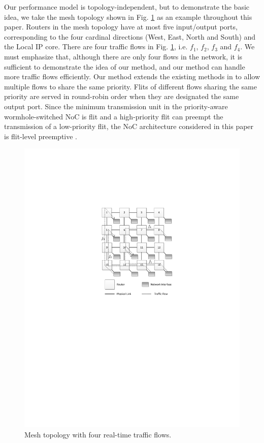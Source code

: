 \documentclass[10pt,journal]{IEEEtran}
\begin{document}
Our performance model is topology-independent, but to demonstrate the basic idea, we take the mesh topology shown in Fig. \ref{topology} as an example throughout this paper. Routers in the mesh topology have at most five input/output ports, corresponding to the four cardinal directions (West, East, North and South) and the Local IP core. There are four traffic flows in Fig. \ref{topology}, i.e. $f_1$, $f_2$, $f_3$ and $f_4$. We must emphasize that, although there are only four flows in the network, it is sufficient to demonstrate the idea of our method, and our method can handle more traffic flows efficiently. Our method extends the existing methods in \cite{73}\cite{Qian489900} to allow multiple flows to share the same priority. Flits of different flows sharing the same priority are served in round-robin order when they are designated the same output port. Since the minimum transmission unit in the priority-aware wormhole-switched NoC is flit and a high-priority flit can preempt the transmission of a low-priority flit, the NoC architecture considered in this paper is flit-level preemptive \cite{Lee:2003:RWC:846077.846083}.
\begin{figure}
  \centering
  \includegraphics[scale=0.75]{figures/mesh.pdf}
  \caption{Mesh topology with four real-time traffic flows.}\label{topology}
\end{figure}
\end{document}
